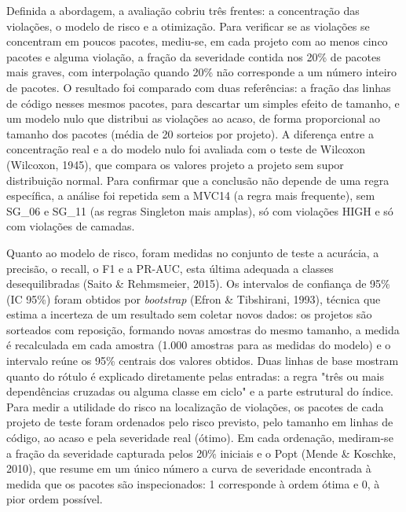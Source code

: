 \documentclass[
  a4paper,
]{article}
\begin{document}
Definida a abordagem, a avaliação cobriu três frentes: a concentração das violações, o modelo de risco e a otimização. Para verificar se as violações se concentram em poucos pacotes, mediu-se, em cada projeto com ao menos cinco pacotes e alguma violação, a fração da severidade contida nos 20\% de pacotes mais graves, com interpolação quando 20\% não corresponde a um número inteiro de pacotes. O resultado foi comparado com duas referências: a fração das linhas de código nesses mesmos pacotes, para descartar um simples efeito de tamanho, e um modelo nulo que distribui as violações ao acaso, de forma proporcional ao tamanho dos pacotes (média de 20 sorteios por projeto). A diferença entre a concentração real e a do modelo nulo foi avaliada com o teste de Wilcoxon (Wilcoxon, 1945), que compara os valores projeto a projeto sem supor distribuição normal. Para confirmar que a conclusão não depende de uma regra específica, a análise foi repetida sem a MVC14 (a regra mais frequente), sem SG\_06 e SG\_11 (as regras Singleton mais amplas), só com violações HIGH e só com violações de camadas.

Quanto ao modelo de risco, foram medidas no conjunto de teste a acurácia, a precisão, o recall, o F1 e a PR-AUC, esta última adequada a classes desequilibradas (Saito \& Rehmsmeier, 2015). Os intervalos de confiança de 95\% (IC 95\%) foram obtidos por \emph{bootstrap} (Efron \& Tibshirani, 1993), técnica que estima a incerteza de um resultado sem coletar novos dados: os projetos são sorteados com reposição, formando novas amostras do mesmo tamanho, a medida é recalculada em cada amostra (1.000 amostras para as medidas do modelo) e o intervalo reúne os 95\% centrais dos valores obtidos. Duas linhas de base mostram quanto do rótulo é explicado diretamente pelas entradas: a regra "três ou mais dependências cruzadas ou alguma classe em ciclo" e a parte estrutural do índice. Para medir a utilidade do risco na localização de violações, os pacotes de cada projeto de teste foram ordenados pelo risco previsto, pelo tamanho em linhas de código, ao acaso e pela severidade real (ótimo). Em cada ordenação, mediram-se a fração da severidade capturada pelos 20\% iniciais e o Popt (Mende \& Koschke, 2010), que resume em um único número a curva de severidade encontrada à medida que os pacotes são inspecionados: 1 corresponde à ordem ótima e 0, à pior ordem possível.
\end{document}
